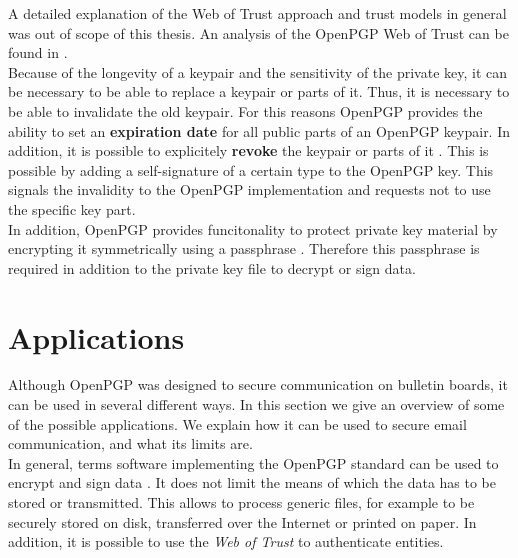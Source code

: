 A detailed explanation of the Web of Trust approach and trust models in general was out of scope of this thesis. An analysis of the OpenPGP Web of Trust can be found in \cite{Ulrich2011}. \\


Because of the longevity of a keypair and the sensitivity of the private key, it can be necessary to be able to replace a keypair or parts of it. Thus, it is necessary to be able to invalidate the old keypair. For this reasons OpenPGP provides the ability to set an \textbf{expiration date} for all public parts of an OpenPGP keypair. In addition, it is possible to explicitely \textbf{revoke} the keypair or parts of it \cite[section 5.2]{RFC4880}. This is possible by adding a self-signature of a certain type to the OpenPGP key. This signals the invalidity to the OpenPGP implementation and requests not to use the specific key part. \\


In addition, OpenPGP provides funcitonality to protect private key material by encrypting it symmetrically using a passphrase \cite[section 3.7]{RFC4880}. Therefore this passphrase is required in addition to the private key file to decrypt or sign data.

\section{Applications} \label{section:openpgp:applications}

Although OpenPGP was designed to secure communication on bulletin boards, it can be used in several different ways. In this section we give an overview of some of the possible applications. We explain how it can be used to secure email communication, and what its limits are.  \\


In general, terms software implementing the OpenPGP standard can be used to encrypt and sign data \cite[section 2]{RFC4880}. It does not limit the means of which the data has to be stored or transmitted. This allows to process generic files, for example to be securely stored on disk, transferred over the Internet or printed on paper. In addition, it is possible to use the \textit{Web of Trust} to authenticate entities. \\  


